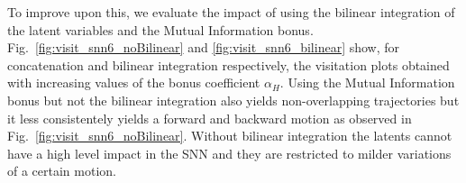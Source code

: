 \documentclass{article} %
\begin{document}
To improve upon this, we evaluate the impact of using the bilinear integration of the latent variables and the Mutual Information bonus. Fig.\ \ref{fig:visit_snn6_noBilinear} and \ref{fig:visit_snn6_bilinear} show, for concatenation and bilinear integration respectively, the visitation plots obtained with increasing values of the bonus coefficient $\alpha_H$. Using the Mutual Information bonus but not the bilinear integration also yields non-overlapping trajectories but it less consistentely yields a forward and backward motion as observed in Fig.\ \ref{fig:visit_snn6_noBilinear}. Without bilinear integration the latents cannot have a high level impact in the SNN and they are restricted to milder variations of a certain motion.
    
\begin{figure}[h]
	\centering
	\label{fig:visit-trpo-individuals}
\end{figure}
\end{document}

